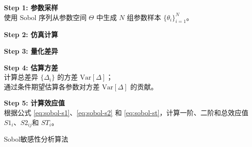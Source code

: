 \begin{algorithm}[htbp]
\SetAlgoLined
{}

\BlankLine
\textbf{Step 1: 参数采样} \\
使用 Sobol 序列从参数空间 $\Theta$ 中生成 $N$ 组参数样本 $\{\theta_i\}_{i=1}^N$。

\BlankLine
\textbf{Step 2: 仿真计算} \\

\BlankLine
\textbf{Step 3: 量化差异} \\

\BlankLine
\textbf{Step 4: 估算方差} \\
计算总差异 $\{\Delta_i\}$ 的方差 $\text{Var}[\Delta]$；\\
通过条件期望估算各参数对方差 $\text{Var}[\Delta]$ 的贡献。

\BlankLine
\textbf{Step 5: 计算效应值} \\
根据公式 \eqref{eq:sobol-s1}、\eqref{eq:sobol-s2} 和 \eqref{eq:sobol-st}，计算一阶、二阶和总效应值$S1_i$、$S2_{ij}$和 $ST_i$。

\caption{Sobol敏感性分析算法}
\label{alg:sobol-sensitivity}
\end{algorithm}

% 
% 
% 
\newpage

